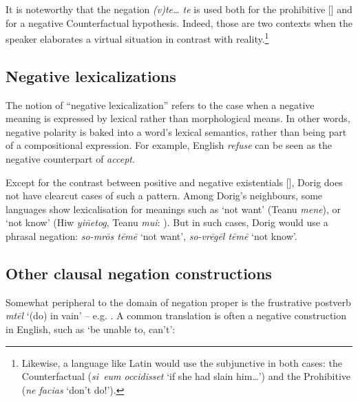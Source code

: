 \documentclass[output=paper,colorlinks,citecolor=brown,draft]{langscibook}
\begin{document}
It is noteworthy that the negation \textit{(v)te… te} is used both for the prohibitive [] and for a negative Counterfactual hypothesis. Indeed, those are two contexts when the speaker elaborates a virtual situation in contrast with reality.\footnote{Likewise, a language like Latin would use the subjunctive in both cases: the Counterfactual (\textit{si~eum occidisset} ‘if she had slain him…’) and the Prohibitive (\textit{ne facias} ‘don’t do!’).}

\subsection{Negative lexicalizations}\label{sec:dor:2.5}

The notion of “negative lexicalization” \citep{Veselinova2013lexicalization} refers to the case when a negative meaning is expressed by lexical rather than morphological means. In other words, negative polarity is baked into a word's lexical semantics, rather than being part of a compositional expression. For example, English \textit{refuse} can be seen as the negative counterpart of \textit{accept}.


Except for the contrast between positive and negative existentials [], Dorig does not have clearcut cases of such a pattern. Among Dorig’s neighbours, some languages show lexicalisation for meanings such as ‘not want’ (Teanu \textit{mene}), or ‘not know’ (Hiw \textit{yi\={n}etog}, Teanu \textit{mui}: \citealt{François2021}). But in such cases, Dorig would use a phrasal negation: \textit{so-mrōs tēmē} ‘not want’,\textit{ so-vrēgēl tēmē} ‘not know’.

\subsection{Other clausal negation constructions}\label{sec:dor:2.6}

Somewhat peripheral to the domain of negation proper is the frustrative postverb \textit{mtēl} ‘(do) in vain’ -- e.g. . A common translation is often a negative construction in English, such as ‘be unable to, can’t’:

\end{document}
